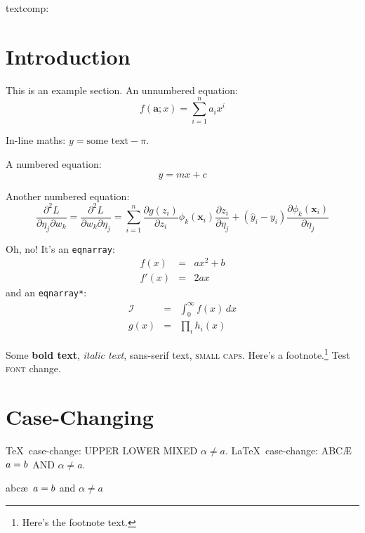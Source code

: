 \documentclass{article}
\newcommand*{\pfrac}[2]{\frac{\partial#1}{\partial#2}}
\newcommand*{\dpfrac}[3]{\frac{\partial^2#1}{\partial#2\partial#3}}
\renewcommand*{\vec}[1]{\boldsymbol{#1}}
\newcommand\testfontchange{Test \textsc{font} change.}
\begin{document}




textcomp: \texttwosuperior\ \texteuro

\section{Introduction}
\label{sec:intro}

This is an example section. An unnumbered equation:
\[
  f(\vec{a}; x) = \sum_{i=1}^n a_i x^i
\]

In-line maths: $y = \text{some text} - \pi$.

A numbered equation:
\begin{equation}
y = m x + c
\label{eq:mx+c}
\end{equation}

Another numbered equation:
\begin{equation}\label{eq:dp}
 \dpfrac{L}{\eta_j}{w_k}
 = \dpfrac{L}{w_k}{\eta_j}
 = \sum_{i=1}^n \pfrac{g(z_i)}{z_i}
   \phi_k(\vec{x}_i)\pfrac{z_i}{\eta_j}
 + (\hat{y}_i - y_i)\pfrac{\phi_k(\vec{x}_i)}{\eta_j}
\end{equation}

Oh, no! It's an \texttt{eqnarray}:
\begin{eqnarray}
f(x) &=& ax^2 +b\label{eq:f}\\
f'(x) &=& 2ax\label{eq:df}
\end{eqnarray}
and an \texttt{eqnarray*}:
\begin{eqnarray*}
\mathcal{I} & = & \int_0^\infty f(x)\,dx\\
g(x) & = & \prod_i h_i(x)
\end{eqnarray*}

Some \textbf{bold text}, \textit{italic text}, 
\textsf{sans-serif text}, \textsc{small caps}.
Here's a footnote.\footnote{Here's the footnote text.}
\testfontchange

\section{Case-Changing}
\label{sec:casechange}

\TeX\ case-change: \uppercase{upper \lowercase{LOWER} MiXeD $\alpha \neq a$.}
\LaTeX\ case-change: \MakeUppercase{abc\ae\ \protect\( a = b
\protect\) and $\alpha \neq a$}.

{abc\ae\ \protect\( a = b
\protect\) and $\alpha \neq a$}
\end{document}
